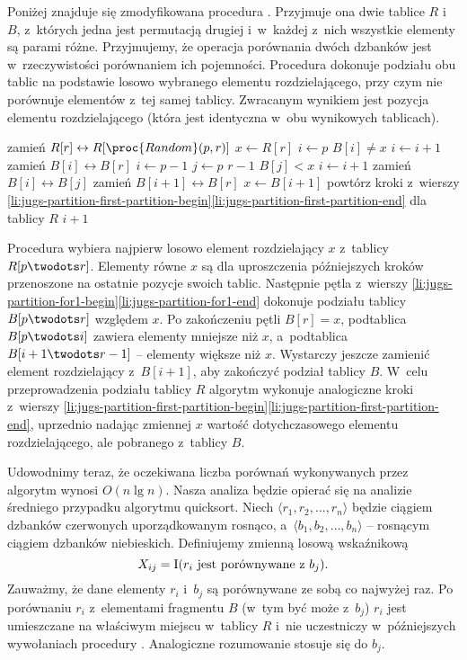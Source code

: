 Poniżej znajduje się zmodyfikowana procedura .
Przyjmuje ona dwie tablice $R$ i~$B$, z~których jedna jest permutacją drugiej i~w~każdej z~nich wszystkie elementy są parami różne.
Przyjmujemy, że operacja porównania dwóch dzbanków jest w~rzeczywistości porównaniem ich pojemności.
Procedura dokonuje podziału obu tablic na podstawie losowo wybranego elementu rozdzielającego, przy czym nie porównuje elementów z~tej samej tablicy.
Zwracanym wynikiem jest pozycja elementu rozdzielającego (która jest identyczna w~obu wynikowych tablicach).
\begin{codebox}
\li	zamień $R[r]\leftrightarrow R[\proc{Random}(p,r)]$
\li	$x\gets R[r]$
\li	$i\gets p$
\li	\While $B[i]\ne x$
\li		\Do $i\gets i+1$
		\End
\li	zamień $B[i]\leftrightarrow B[r]$
\li	$i\gets p-1$ \label{li:jugs-partition-first-partition-begin}
\li	\For $j\gets p$ \To $r-1$ \label{li:jugs-partition-for1-begin}
\li		\Do \If $B[j]<x$
\li				\Then $i\gets i+1$
\li					zamień $B[i]\leftrightarrow B[j]$
				\End
		\End \label{li:jugs-partition-for1-end}
\li	zamień $B[i+1]\leftrightarrow B[r]$ \label{li:jugs-partition-first-partition-end}
\li	$x\gets B[i+1]$
\li	powtórz kroki z~wierszy \ref{li:jugs-partition-first-partition-begin}\nbendash\ref{li:jugs-partition-first-partition-end} dla tablicy $R$ \label{li:jugs-partition-second-partition}
\li	\Return $i+1$
\end{codebox}

Procedura wybiera najpierw losowo element rozdzielający $x$ z~tablicy $R[p\twodots r]$.
Elementy równe $x$ są dla uproszczenia późniejszych kroków przenoszone na ostatnie pozycje swoich tablic.
Następnie pętla  z~wierszy \ref{li:jugs-partition-for1-begin}\nbendash\ref{li:jugs-partition-for1-end} dokonuje podziału tablicy $B[p\twodots r]$ względem $x$.
Po zakończeniu pętli $B[r]=x$, podtablica $B[p\twodots i]$ zawiera elementy mniejsze niż $x$, a~podtablica $B[i+1\twodots r-1]$ -- elementy większe niż $x$.
Wystarczy jeszcze zamienić element rozdzielający z~$B[i+1]$, aby zakończyć podział tablicy $B$.
W~celu przeprowadzenia podziału tablicy $R$ algorytm wykonuje analogiczne kroki z~wierszy \ref{li:jugs-partition-first-partition-begin}\nbendash\ref{li:jugs-partition-first-partition-end}, uprzednio nadając zmiennej $x$ wartość dotychczasowego elementu rozdzielającego, ale pobranego z~tablicy $B$.

Udowodnimy teraz, że oczekiwana liczba porównań wykonywanych przez algorytm  wynosi $O(n\lg n)$.
Nasza analiza będzie opierać się na analizie średniego przypadku algorytmu quicksort.
Niech $\langle r_1,r_2,\dots,r_n\rangle$ będzie ciągiem dzbanków czerwonych uporządkowanym rosnąco, a~$\langle b_1,b_2,\dots,b_n\rangle$ -- rosnącym ciągiem dzbanków niebieskich.
Definiujemy zmienną losową wskaźnikową
\[
    X_{ij} = \operatorname{I}(\text{$r_i$ jest porównywane z~$b_j$}).
\]
Zauważmy, że dane elementy $r_i$ i~$b_j$ są porównywane ze sobą co najwyżej raz.
Po porównaniu $r_i$ z~elementami fragmentu $B$ (w~tym być może z~$b_j$) $r_i$ jest umieszczane na właściwym miejscu w~tablicy $R$ i~nie uczestniczy w~późniejszych wywołaniach procedury .
Analogiczne rozumowanie stosuje się do $b_j$.

